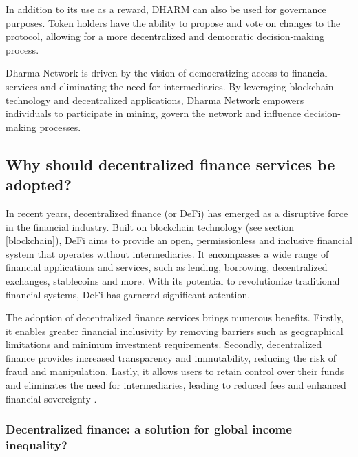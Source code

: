 In addition to its use as a reward, DHARM can also be used for governance purposes. Token holders have the ability to propose and vote on changes to the protocol, allowing for a more decentralized and democratic decision-making process.\newline

Dharma Network is driven by the vision of democratizing access to financial services and eliminating the need for intermediaries. By leveraging blockchain technology and decentralized applications, Dharma Network empowers individuals to participate in mining, govern the network and influence decision-making processes.

\subsection{Why should decentralized finance services be adopted?}

In recent years, decentralized finance (or DeFi) has emerged as a disruptive force in the financial industry. Built on blockchain technology (see section \ref{blockchain}), DeFi aims to provide an open, permissionless and inclusive financial system that operates without intermediaries. It encompasses a wide range of financial applications and services, such as lending, borrowing, decentralized exchanges, stablecoins and more. With its potential to revolutionize traditional financial systems, DeFi has garnered significant attention.

The adoption of decentralized finance services brings numerous benefits. Firstly, it enables greater financial inclusivity by removing barriers such as geographical limitations and minimum investment requirements. Secondly, decentralized finance provides increased transparency and immutability, reducing the risk of fraud and manipulation. Lastly, it allows users to retain control over their funds and eliminates the need for intermediaries, leading to reduced fees and enhanced financial sovereignty \cite{twp, cwi, coint}.

\subsubsection{Decentralized finance: a solution for global income inequality?}

